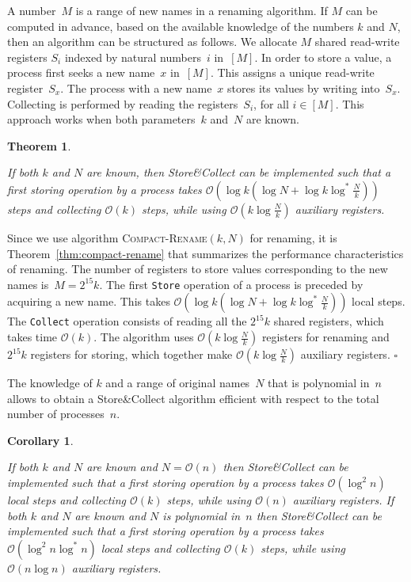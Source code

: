 \documentclass[11pt]{article}
\newcommand{\cO}{\mathcal{O}}
\newcommand{\qed}{\hfill $\square$ \smallbreak}
\newenvironment{proof}{\noindent{\bf Proof:}}{\qed}
\newtheorem{theorem}{Theorem}
\newtheorem{corollary}{Corollary}
\begin{document}
A number~$M$ is a range of new names in a renaming algorithm.
If $M$ can be computed in advance, based on the available knowledge of the numbers $k$ and $N$, then an algorithm can be structured as follows.
We allocate $M$ shared read-write registers $S_i$ indexed by natural numbers~$i$ in~$[M]$.
In order to store a value, a process first seeks a new name~$x$ in~$[M]$.
This assigns a unique read-write register~$S_x$.
The process with a new name~$x$ stores its values by writing into~$S_x$.
Collecting is performed by reading the registers~$S_i$, for all $i\in [M]$.
This approach works when both parameters~$k$ and~$N$ are known.



\begin{theorem}
\label{thm:collect-k-N-both-known}

If both $k$ and $N$ are known, then Store\&Collect can be implemented such that a first storing operation by a process takes  $\cO(\log k (\log N + \log k\log^* \frac{N}{k}))$ steps and collecting $\cO(k)$ steps, while using $\cO(k\log\frac{N}{k})$ auxiliary registers.
\end{theorem}

\begin{proof}
Since we use algorithm \textsc{Compact-Rename}$(k,N)$ for renaming, it is Theorem~\ref{thm:compact-rename} that summarizes the performance characteristics of renaming. 
The number of registers to store values corresponding to the new names is~$M=2^{15}k$.
The first \texttt{Store} operation of a process is preceded by acquiring a new name.
This takes  $\cO(\log k (\log N + \log k\log^* \frac{N}{k}))$ local steps.
The \texttt{Collect} operation consists of reading all the $2^{15} k$ shared registers, which takes time $\cO(k)$.
The algorithm uses $\cO(k\log\frac{N}{k})$ registers for renaming and $2^{15}k$ registers for storing, which together make $\cO(k\log\frac{N}{k})$ auxiliary registers.
\end{proof}


The knowledge of $k$ and a range of original names~$N$ that is polynomial in~$n$ allows to obtain a Store\&Collect algorithm efficient with respect to the total number of processes~$n$.



\begin{corollary}
\label{cor:store-collect-both-k-and-N-known}

If both $k$ and $N$ are known and  $N=\cO(n)$ then Store\&Collect can be implemented such that a first storing operation by a process takes  $\cO(\log^2 n)$ local steps  and collecting $\cO(k)$ steps, while using $\cO(n)$ auxiliary registers.
If both $k$ and $N$ are known and  $N$ is polynomial in~$n$ then Store\&Collect can be implemented such that a first storing operation by a process takes  $\cO(\log^2 n \log^* n)$ local steps  and collecting $\cO(k)$ steps, while using $\cO(n\log n)$ auxiliary registers.
\end{corollary}
\end{document}
